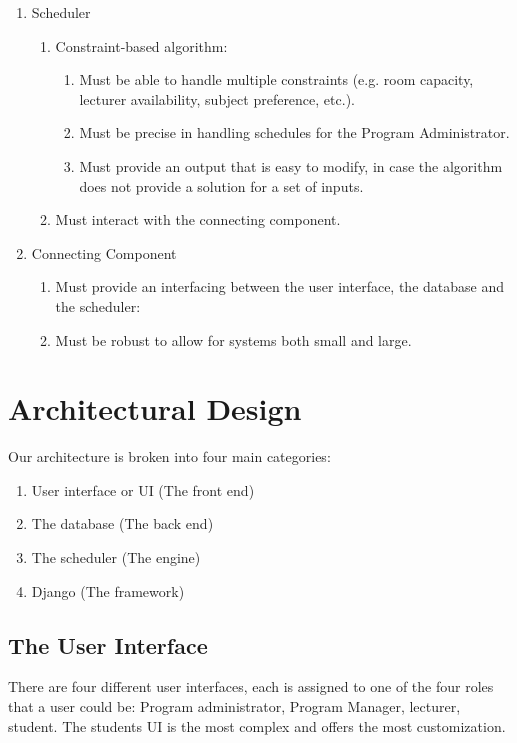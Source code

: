\documentclass[12pt]{article}
\begin{document}
\begin{enumerate}
\begin{enumerate}
	\end{enumerate}
\item Scheduler
      \begin{enumerate}
      \item Constraint-based algorithm:
      	    \begin{enumerate}
            \item Must be able to handle multiple constraints (e.g. room capacity, lecturer availability, subject preference, etc.).
	    \item Must be precise in handling schedules for the Program Administrator.
	    \item Must provide an output that is easy to modify, in case the algorithm does not provide a solution for a set of inputs.
	    \end{enumerate}
	\item Must interact with the connecting component.
     \end{enumerate}
\item Connecting Component
      \begin{enumerate}
      \item Must provide an interfacing between the user interface, the database and the scheduler:
    \item Must be robust to allow for systems both small and large.
     \end{enumerate}
\end{enumerate}

\section{Architectural Design} %
Our architecture is broken into four main categories:
\begin{enumerate}
\item User interface or UI (The front end)
\item The database  (The back end)
\item The scheduler (The engine)
\item Django (The framework)
\end{enumerate}

\subsection{The User Interface}
There are four different user interfaces, each is assigned to one of the four roles that a user could be: Program administrator, Program Manager, lecturer, student. The students UI is the most complex and offers the most customization.
\end{document}
